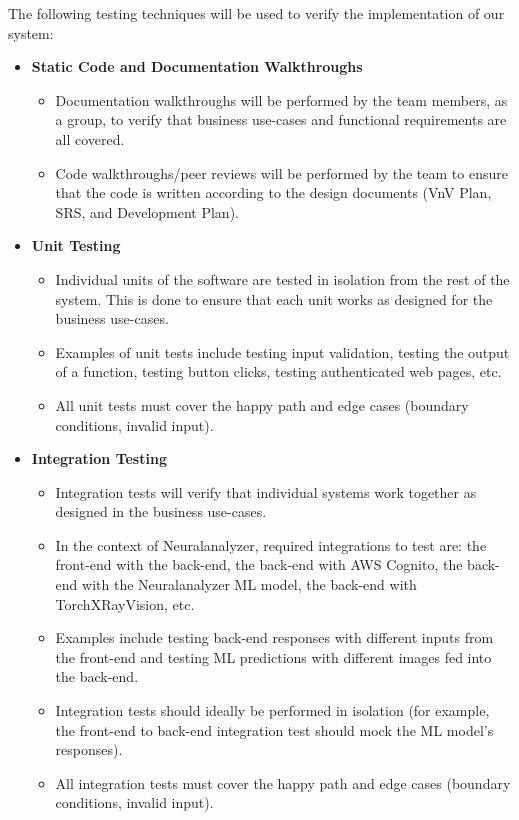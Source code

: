 \documentclass[12pt, titlepage]{article}
\begin{document}
The following testing techniques will be used to verify the implementation of our system:
\begin{itemize}
  \item[] {\textbf{Static Code and Documentation Walkthroughs}}
  \begin{itemize}
    \item Documentation walkthroughs will be performed by the team members, as a group, to verify that business use-cases and functional requirements are all covered.
    \item Code walkthroughs/peer reviews will be performed by the team to ensure that the code is written according to the design documents (VnV Plan, SRS, and Development Plan).
  \end{itemize}

  \item[] {\textbf{Unit Testing}}
  \begin{itemize}
    \item Individual units of the software are tested in isolation from the rest of the system. This is done to ensure that each unit works as designed for the business use-cases.
    \item Examples of unit tests include testing input validation, testing the output of a function, testing button clicks, testing authenticated web pages, etc.
    \item All unit tests must cover the happy path and edge cases (boundary conditions, invalid input).
  \end{itemize}
  
  \item[] {\textbf{Integration Testing}}
  \begin{itemize}
    \item Integration tests will verify that individual systems work together as designed in the business use-cases.
    \item In the context of Neuralanalyzer, required integrations to test are: the front-end with the back-end, the back-end with AWS Cognito, the back-end with the Neuralanalyzer ML model, the back-end with TorchXRayVision, etc.
    \item Examples include testing back-end responses with different inputs from the front-end and testing ML predictions with different images fed into the back-end.
    \item Integration tests should ideally be performed in isolation (for example, the front-end to back-end integration test should mock the ML model's responses).
    \item All integration tests must cover the happy path and edge cases (boundary conditions, invalid input).
  \end{itemize}
  

\end{itemize}
\end{document}
